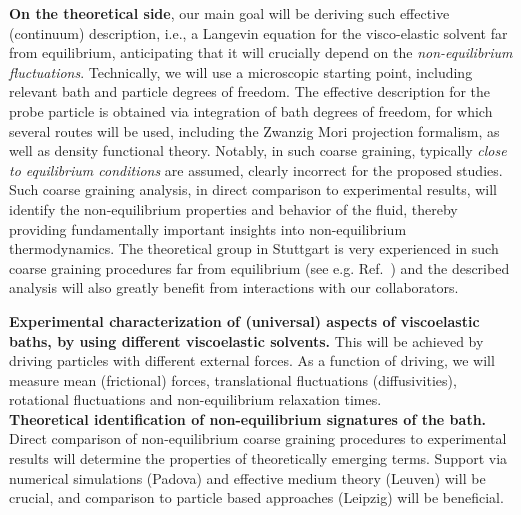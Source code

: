\begin{workpackage}
\begin{wpdescription}
{\bf On the theoretical side}, our main goal will be deriving such effective (continuum)
description, i.e., a Langevin equation for the visco-elastic solvent far from equilibrium,
anticipating that it will crucially depend on the {\it non-equilibrium
  fluctuations}. Technically, we will use a microscopic starting point, including relevant
bath and particle degrees of freedom. The effective description for the probe particle is
obtained via integration of bath degrees of freedom, for which several routes will be used,
including the Zwanzig Mori projection formalism, as well as density functional
theory. Notably, in such coarse graining, typically {\it close to equilibrium conditions}
are assumed, clearly incorrect for the proposed studies. Such coarse graining analysis, in
direct comparison to experimental results, will identify the non-equilibrium properties and
behavior of the fluid, thereby providing fundamentally important insights into
non-equilibrium thermodynamics. The theoretical group in Stuttgart is very experienced in
such coarse graining procedures far from equilibrium (see e.g. Ref.~\cite{Aerov14}) and the described analysis will also
greatly benefit from interactions with our collaborators.


\end{wpdescription}

\begin{tasklist}

\begin{task}[title=task1,id=brown-t1,PM=24,lead=USTUTT,wphases=0-24!1.0]
{\bf Experimental characterization of (universal) aspects of viscoelastic baths, by using different viscoelastic solvents.} This will be achieved by driving particles with different external forces. As a function of driving, we will measure mean (frictional) forces, translational fluctuations (diffusivities), rotational fluctuations and non-equilibrium relaxation times.\\
{\bf Theoretical identification of non-equilibrium signatures of the bath.} Direct comparison of non-equilibrium coarse graining procedures to experimental results will determine the properties of theoretically emerging terms. Support via numerical simulations (Padova) and effective medium theory (Leuven) will be crucial, and comparison to particle based approaches (Leipzig) will be beneficial.\\
\end{task}


\end{tasklist}
\end{workpackage}
